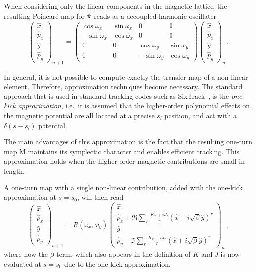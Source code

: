 When considering only the linear components in the magnetic lattice, the resulting Poincaré map for $\vb{\hat x}$ reads as a decoupled harmonic oscillator
%
\begin{equation} 
	\begin{pmatrix}
		\hat x \\ \hat p_x \\ \hat y \\ \hat p_y 
	\end{pmatrix}_{n+1}
	=
	\begin{pmatrix}
		\cos\omega_x & \sin\omega_x & 0 & 0 \\
		-\sin\omega_x & \cos\omega_x & 0 & 0 \\
		0 & 0 &\cos\omega_y & \sin\omega_y \\
		0 & 0 &-\sin\omega_y & \cos\omega_y
	\end{pmatrix}
	\begin{pmatrix}
		\hat x \\ \hat p_x \\ \hat y \\ \hat p_y 
	\end{pmatrix}_{n}\,.
\end{equation}

In general, it is not possible to compute exactly the transfer map of a non-linear element. Therefore, approximation techniques become necessary. The standard approach that is used in standard tracking codes such as SixTrack~\cite{sixtrack}, is the \textit{one-kick approximation}, i.e.\ it is assumed that the higher-order polynomial effects on the magnetic potential are all located at a precise $s_l$ position, and act with a $\delta(s - s_l)$ potential.

The main advantages of this approximation is the fact that the resulting one-turn map $\mathrm{M}$ maintains its symplectic character and enables efficient tracking. This approximation holds when the higher-order magnetic contributions are small in length.

A one-turn map with a single non-linear contribution, added 
with the one-kick approximation at $s = s_0$, will then read  
\begin{equation}
	\begin{pmatrix}
		\hat x \\ \hat p_x \\ \hat y \\ \hat p_y 
	\end{pmatrix}_{n+1}
	=
	R(\omega_x,\omega_y)
	\begin{pmatrix}
		\hat x \\ \hat p_x + \Re \sum_r\frac{K_r + iJ_r}{r}(\hat x+ i\sqrt{\beta}\hat y)^r \\ \hat y \\ \hat p_y - \Im \sum_r\frac{K_r + iJ_r}{r}(\hat x+ i\sqrt{\beta}\hat y)^r  
	\end{pmatrix}_{n}\,,
\end{equation}
where now the $\beta$ term, which also appears in the definition of $K$ and $J$ is now evaluated at $s=s_0$ due to the one-kick approximation.

